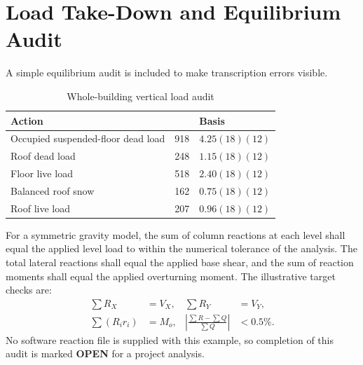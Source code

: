 \section{Load Take-Down and Equilibrium Audit}

A simple equilibrium audit is included to make transcription errors visible.

\begin{table}[htbp]
\centering
\caption{Whole-building vertical load audit}
\begin{tabularx}{\textwidth}{@{}Y R{30mm}Y@{}}
  \toprule
  \textbf{Action} &  & \textbf{Basis} \\
  \midrule
  Occupied suspended-floor dead load & 918 & $4.25(18)(12)$ \\
  Roof dead load & 248 & $1.15(18)(12)$ \\
  Floor live load & 518 & $2.40(18)(12)$ \\
  Balanced roof snow & 162 & $0.75(18)(12)$ \\
  Roof live load & 207 & $0.96(18)(12)$ \\
  \bottomrule
\end{tabularx}
\end{table}

For a symmetric gravity model, the sum of column reactions at each level shall equal
the applied level load to within the numerical tolerance of the analysis. The total
lateral reactions shall equal the applied base shear, and the sum of reaction moments
shall equal the applied overturning moment. The illustrative target checks are:
\begin{align}
  \sum R_X &= V_X, & \sum R_Y &= V_Y,\\
  \sum (R_i r_i) &= M_o, &
  \left|\frac{\sum R-\sum Q}{\sum Q}\right| &<0.5\%.
\end{align}
No software reaction file is supplied with this example, so completion of this audit
is marked \textbf{OPEN} for a project analysis.

